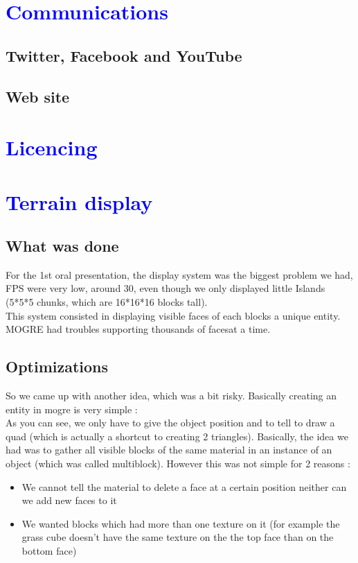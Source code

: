 \documentclass[article]{report} %
\begin{document}
  		\chapter{\textcolor{blue}{Communications}}
			\section{Twitter, Facebook and YouTube }
				
			\section{Web site}
				
		\chapter{\textcolor{blue}{Licencing}}

		\chapter{\textcolor{blue}{Terrain display}}
			\section{What was done}
				For the 1st oral presentation, the display system was the biggest problem we had, FPS were very low, around 30, even though we only displayed little Islands (5*5*5 chunks, which are 16*16*16 blocks tall).\\
This system consisted in displaying visible faces of each blocks a unique entity. MOGRE had troubles supporting thousands of facesat a time.

			\section{Optimizations}
				So we came up with another idea, which was a bit risky. Basically creating an entity in mogre is very simple :\\
As you can see, we only have to give the object position and to tell to draw a quad (which is actually a shortcut to creating 2 triangles).
Basically, the idea we had was to gather all visible blocks of the same material in an instance of an object (which was called multiblock). However this was not simple for 2 reasons :
\begin{itemize}
\item We cannot tell the material to delete a face at a certain position neither can we add new faces to it
\item We wanted blocks which had more than one texture on it (for example the grass cube doesn't have the same texture on the the top face than on the bottom
 face)
 \end {itemize}
\end{document}
